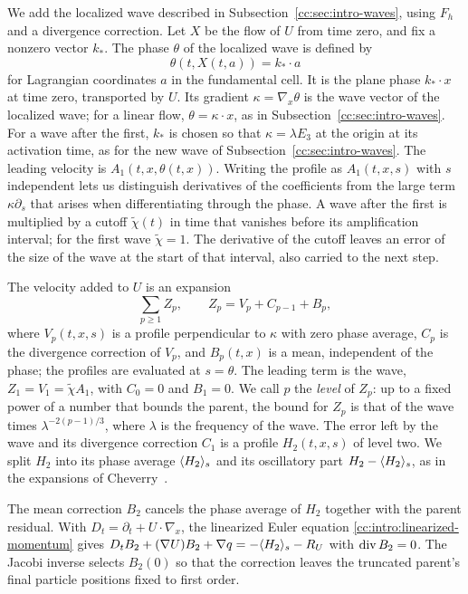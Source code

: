 We add the localized wave described in Subsection~\ref{cc:sec:intro-waves},
using $F_h$ and a divergence correction. Let $X$ be the flow of $U$ from
time zero, and fix a nonzero vector $k_*$. The phase $\theta$ of the
localized wave is defined by
\[
 \theta(t,X(t,a))=k_*\cdot a
\]
for Lagrangian coordinates $a$ in the fundamental cell. It is the plane
phase $k_*\cdot x$ at time zero, transported by $U$. Its gradient
$\kappa=\nabla_x\theta$ is the wave vector of the localized wave; for a
linear flow, $\theta=\kappa\cdot x$, as in
Subsection~\ref{cc:sec:intro-waves}. For a wave after the first, $k_*$
is chosen so that $\kappa=\lambda E_3$ at the origin at its activation
time, as for the new wave of Subsection~\ref{cc:sec:intro-waves}.
The leading velocity is $A_1(t,x,\theta(t,x))$. Writing the profile as
$A_1(t,x,s)$ with $s$ independent lets us distinguish derivatives of
the coefficients from the large term $\kappa\partial_s$ that arises
when differentiating through the phase.
A wave after the first is multiplied
by a cutoff $\widetilde\chi(t)$ in time that vanishes before its
amplification interval; for the first wave $\widetilde\chi=1$.
The derivative of the cutoff leaves an error of the size of the wave at
the start of that interval, also carried to the next step.

The velocity added to $U$ is an expansion
\[
 \sum_{p\ge1}Z_p,\qquad Z_p=V_p+C_{p-1}+B_p,
\]
where $V_p(t,x,s)$ is a profile perpendicular to $\kappa$ with zero
phase average, $C_p$ is the divergence correction of $V_p$, and
$B_p(t,x)$ is a mean, independent of the phase; the profiles are
evaluated at $s=\theta$. The leading term is the wave,
$Z_1=V_1=\widetilde\chi A_1$, with $C_0=0$ and $B_1=0$. We call $p$ the
\emph{level} of $Z_p$: up to a fixed power of a number that bounds the
parent, the bound for $Z_p$ is that of the wave times
$\lambda^{-2(p-1)/3}$, where $\lambda$ is the frequency of the wave.
The error left by the wave and its divergence correction $C_1$ is a
profile $H_2(t,x,s)$ of level two.
We split $H_2$ into its phase average $\langle H_2\rangle_s$ and its
oscillatory part $H_2-\langle H_2\rangle_s$, as in the expansions of
Cheverry~\cite[Section~4.1]{Cheverry2006}.

The mean correction $B_2$ cancels the phase average of $H_2$ together
with the parent residual. With $D_t=\partial_t+U\cdot\nabla_x$, the
linearized Euler equation \eqref{cc:intro:linearized-momentum} gives
$D_t B_2+(\nabla U)B_2+\nabla q=-\langle H_2\rangle_s-R_U$ with
$\operatorname{div} B_2=0$. The Jacobi inverse selects $B_2(0)$ so that the
correction leaves the truncated parent's final particle positions fixed
to first order.

